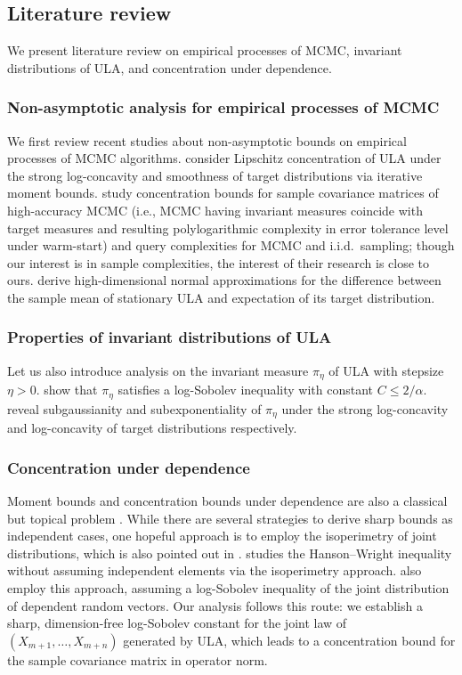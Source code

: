 \documentclass[12pt,reqno]{amsart}
\theoremstyle{remark}
\theoremstyle{definition}
\begin{document}
\subsection{Literature review}\label{sec:intro:literature}
We present literature review on empirical processes of MCMC, invariant distributions of ULA, and concentration under dependence.

\subsubsection*{Non-asymptotic analysis for empirical processes of MCMC}
We first review recent studies about non-asymptotic bounds on empirical processes of MCMC algorithms.
\citet[Section 4]{durmus2019high} consider Lipschitz concentration of ULA under the strong log-concavity and smoothness of target distributions via iterative moment bounds.
\citet{kook2024covariance} study concentration bounds for sample covariance matrices of high-accuracy MCMC (i.e., MCMC having invariant measures coincide with target measures and resulting polylogarithmic complexity in error tolerance level under warm-start) and query complexities for MCMC and i.i.d.~sampling; though our interest is in sample complexities, the interest of their research is close to ours.
\citet{shen2025high} derive high-dimensional normal approximations for the difference between the sample mean of stationary ULA and expectation of its target distribution.

\subsubsection*{Properties of invariant distributions of ULA}
Let us also introduce analysis on the invariant measure $\pi_{\eta}$ of ULA with stepsize $\eta>0$.
\citet[arXiv v4]{vempala2019rapid} show that $\pi_{\eta}$ satisfies a log-Sobolev inequality with constant $C\le 2/\alpha$.
\citet[arXiv v2]{altschuler2022concentration} reveal subgaussianity and subexponentiality of $\pi_{\eta}$ under the strong log-concavity and log-concavity of target distributions respectively.

\subsubsection*{Concentration under dependence}
Moment bounds and concentration bounds under dependence are also a classical but topical problem \citep[e.g.,][]{han2020moment,neeman2024concentration}.
While there are several strategies to derive sharp bounds as independent cases, one hopeful approach is to employ the isoperimetry of joint distributions, which is also pointed out in \citet{kook2024covariance}.
\citet{adamczak2015note} studies the Hanson--Wright inequality without assuming independent elements via the isoperimetry approach.
\citet{nakakita2025corrigendum} also employ this approach, assuming a log-Sobolev inequality of the joint distribution of dependent random vectors.
Our analysis follows this route: we establish a sharp, dimension-free log-Sobolev constant for the joint law of $(X_{m+1},\ldots,X_{m+n})$ generated by ULA, which leads to a concentration bound for the sample covariance matrix in operator norm.
\end{document}
